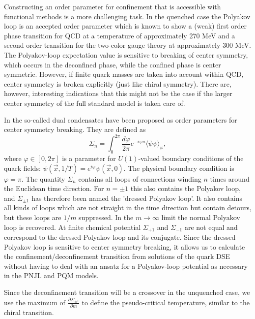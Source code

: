 \documentclass[a4paper,fleqn]{cls/cas-dc}
\begin{document}
Constructing an order parameter for confinement that is accessible with functional methods is a more challenging task.
In the quenched case the Polyakov loop is an accepted order parameter which is known to show a (weak) first order phase
transition for QCD at a temperature of approximately 270 MeV and a second order transition for the two-color gauge theory
at approximately 300 MeV. The Polyakov-loop expectation value is sensitive to breaking of center symmetry, which occurs in
the deconfined phase, while the confined phase is center symmetric. However, if finite quark masses are taken into account
within QCD, center symmetry is broken explicitly (just like chiral symmetry). There are, however, interesting indications
that this might not be the case if the larger center symmetry of the full standard model is taken care of.

In \cite{PhysRevD.77.094007,PhysRevLett.97.032003,PhysRevD.75.114003} the so-called dual condensates have been proposed as order parameters for center symmetry breaking. They
are defined as
\begin{equation}
	\Sigma_n = \int_{0}^{2\pi} \frac{d \varphi}{2 \pi} e^{-i \varphi n} \langle \overline{\psi}\psi \rangle_\varphi,
\end{equation}
where $\varphi \in [ 0 , 2\pi ]$ is a parameter for $U (1 )$-valued boundary conditions of the quark fields: $\psi(\vec{x} , 1 / T ) = e^{i\varphi} \psi(\vec{x} , 0 )$. The
physical boundary condition is $\varphi = \pi$. The quantity $\Sigma_n$ contains all loops of connections winding $n$ times around the
Euclidean time direction. For $n = ± 1$ this also contains the Polyakov loop, and $\Sigma_{\pm 1}$ has therefore been named the 'dressed
Polyakov loop’. It also contains all kinds of loops which are not straight in the time direction but contain detours, but these
loops are $1 / m$ suppressed. In the $m \rightarrow \infty$ limit the normal Polyakov loop is recovered. At finite chemical potential $\Sigma_{+1}$
and $\Sigma_{- 1}$ are not equal and correspond to the dressed Polyakov loop and its conjugate. Since the dressed Polyakov loop is
sensitive to center symmetry breaking, it allows us to calculate the confinement/deconfinement transition from solutions of
the quark DSE without having to deal with an ansatz for a Polyakov-loop potential as necessary in the PNJL and PQM models.


Since the deconfinement transition will be a crossover in the unquenched case, we use the maximum of $\frac{\partial \Sigma_{\pm 1}}{\partial m} $ to define
the pseudo-critical temperature, similar to the chiral transition.
\end{document}
